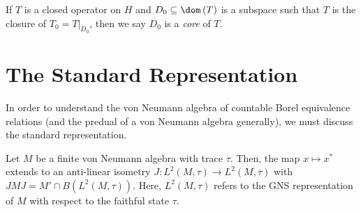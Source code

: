\documentclass[10pt]{mypackage}
\begin{document}
If $T$ is a closed operator on $H$ and $D_0\subseteq \dom\left( T \right)$ is a subspace such that $T$ is the closure of $T_0 = T|_{D_0}$, then we say $D_0$ is a \textit{core} of $T$.
\section{The Standard Representation}%
In order to understand the von Neumann algebra of countable Borel equivalence relations (and the predual of a von Neumann algebra generally), we must discuss the standard representation.
\begin{proposition}
  Let $M$ be a finite von Neumann algebra with trace $\tau$. Then, the map $x\mapsto x^{\ast}$ extends to an anti-linear isometry $J\colon L^2\left( M,\tau \right)\rightarrow L^2\left( M,\tau \right)$ with $JMJ = M'\cap B\left( L^2\left( M,\tau \right) \right)$. Here, $L^2\left( M,\tau \right)$ refers to the GNS representation of $M$ with respect to the faithful state $\tau$.
\end{proposition}
\end{document}
